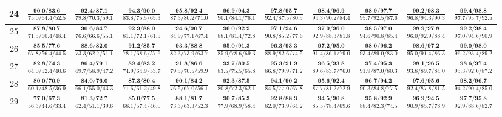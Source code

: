 \documentclass{slides}
\begin{document}
{{{\begin{tabular}{|c|c|c|c|c|c|c|c|c|c|c|}
\hline
24 & $\frac{\textbf{90.0/83.6}}{75.0/64.4/52.5}$ & $\frac{\textbf{92.4/87.1}}{79.8/70.3/59.1}$ & $\frac{\textbf{94.3/90.0}}{83.8/75.5/65.3}$ & $\frac{\textbf{95.8/92.4}}{87.3/80.2/71.0}$ & $\frac{\textbf{96.9/94.3}}{90.1/84.1/76.1}$ & $\frac{\textbf{97.8/95.7}}{92.4/87.5/80.5}$ & $\frac{\textbf{98.4/96.9}}{94.3/90.2/84.4}$ & $\frac{\textbf{98.9/97.7}}{95.7/92.5/87.6}$ & $\frac{\textbf{99.2/98.3}}{96.8/94.3/90.3}$ & $\frac{\textbf{99.4/98.8}}{97.7/95.7/92.5}$ \\
\hline
25 & $\frac{\textbf{87.8/80.7}}{71.5/60.4/48.4}$ & $\frac{\textbf{90.6/84.7}}{76.6/66.6/55.1}$ & $\frac{\textbf{92.9/88.0}}{81.1/72.1/61.5}$ & $\frac{\textbf{94.6/90.7}}{84.9/77.1/67.4}$ & $\frac{\textbf{96.0/92.9}}{88.1/81.4/72.8}$ & $\frac{\textbf{97.1/94.6}}{90.8/85.2/77.6}$ & $\frac{\textbf{97.9/96.0}}{92.9/88.3/81.8}$ & $\frac{\textbf{98.5/97.0}}{94.6/90.8/85.4}$ & $\frac{\textbf{98.9/97.8}}{96.0/92.9/88.4}$ & $\frac{\textbf{99.2/98.4}}{97.0/94.6/90.9}$ \\
\hline
26 & $\frac{\textbf{85.5/77.6}}{67.8/56.4/44.5}$ & $\frac{\textbf{88.6/82.0}}{73.3/62.7/51.1}$ & $\frac{\textbf{91.2/85.7}}{78.1/68.6/57.6}$ & $\frac{\textbf{93.3/88.8}}{82.3/73.9/63.7}$ & $\frac{\textbf{95.0/91.3}}{85.9/78.6/69.3}$ & $\frac{\textbf{96.3/93.3}}{88.9/82.6/74.5}$ & $\frac{\textbf{97.2/95.0}}{91.4/86.1/79.0}$ & $\frac{\textbf{98.0/96.2}}{93.4/89.0/83.0}$ & $\frac{\textbf{98.6/97.2}}{95.0/91.4/86.3}$ & $\frac{\textbf{99.0/98.0}}{96.2/93.4/89.2}$ \\
\hline
27 & $\frac{\textbf{82.8/74.3}}{64.0/52.4/40.6}$ & $\frac{\textbf{86.4/79.1}}{69.7/58.9/47.2}$ & $\frac{\textbf{89.4/83.2}}{74.9/64.9/53.7}$ & $\frac{\textbf{91.8/86.6}}{79.5/70.5/59.9}$ & $\frac{\textbf{93.7/89.5}}{83.5/75.5/65.8}$ & $\frac{\textbf{95.3/91.9}}{86.8/79.9/71.2}$ & $\frac{\textbf{96.5/93.8}}{89.6/83.7/76.0}$ & $\frac{\textbf{97.4/95.3}}{91.9/87.0/80.3}$ & $\frac{\textbf{98.1/96.5}}{93.8/89.7/84.0}$ & $\frac{\textbf{98.6/97.4}}{95.3/92.0/87.2}$ \\
\hline
28 & $\frac{\textbf{80.0/70.9}}{60.1/48.5/36.9}$ & $\frac{\textbf{84.0/76.0}}{66.1/55.0/43.3}$ & $\frac{\textbf{87.3/80.4}}{71.6/61.2/49.8}$ & $\frac{\textbf{90.1/84.2}}{76.5/67.0/56.1}$ & $\frac{\textbf{92.3/87.5}}{80.8/72.3/62.1}$ & $\frac{\textbf{94.1/90.2}}{84.5/77.0/67.8}$ & $\frac{\textbf{95.6/92.4}}{87.7/81.2/72.9}$ & $\frac{\textbf{96.7/94.2}}{90.3/84.8/77.5}$ & $\frac{\textbf{97.6/95.6}}{92.4/87.8/81.5}$ & $\frac{\textbf{98.2/96.7}}{94.2/90.4/85.0}$ \\
\hline
29 & $\frac{\textbf{77.0/67.3}}{56.3/44.6/33.4}$ & $\frac{\textbf{81.3/72.7}}{62.4/51.1/39.6}$ & $\frac{\textbf{85.0/77.5}}{68.1/57.4/46.0}$ & $\frac{\textbf{88.1/81.7}}{73.3/63.3/52.3}$ & $\frac{\textbf{90.7/85.3}}{77.9/68.9/58.4}$ & $\frac{\textbf{92.8/88.3}}{82.0/73.9/64.2}$ & $\frac{\textbf{94.5/90.8}}{85.5/78.4/69.6}$ & $\frac{\textbf{95.8/92.9}}{88.4/82.3/74.5}$ & $\frac{\textbf{96.9/94.5}}{90.9/85.7/78.9}$ & $\frac{\textbf{97.7/95.8}}{92.9/88.6/82.7}$ \\

\end{tabular}}}}
\end{document}
